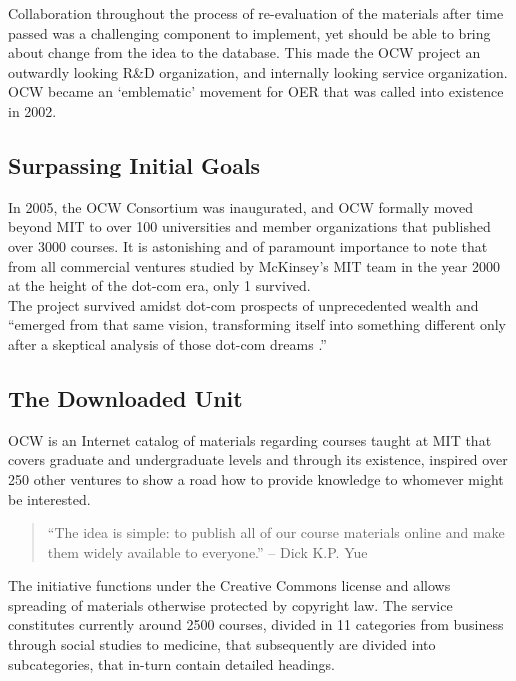 \documentclass[a4paper]{article}
\begin{document}
\noindent
Collaboration throughout the process of re-evaluation of the materials after time passed was a challenging component to implement, yet should be able to bring about change from the idea to the database. This made the OCW project an outwardly looking R\&D organization, and internally looking service organization. OCW became an `emblematic' movement for OER that was called into existence in 2002. 

\subsection{Surpassing Initial Goals} 
In 2005, the OCW Consortium was inaugurated, and OCW formally moved beyond MIT to over 100 universities and member organizations that published over 3000 courses. It is astonishing and of paramount importance to note that from all commercial ventures studied by McKinsey's MIT team in the year 2000 at the height of the dot-com era, only 1 survived.\\

\noindent
The project survived amidst dot-com prospects of unprecedented wealth and ``emerged from that same vision, transforming itself into something different only after a skeptical analysis of those dot-com dreams \cite{OCW}.''

\subsection{The Downloaded Unit} 
OCW is an Internet catalog of materials regarding courses taught at MIT that covers graduate and undergraduate levels and through its existence, inspired over 250 other ventures to show a road how to provide knowledge to whomever might be interested. \\

\begin{quote}
``The idea is simple: to publish all of our course materials online and make them widely available to everyone.'' -- Dick K.P. Yue \\
\end{quote}

\noindent
The initiative functions under the Creative Commons license and allows spreading of materials otherwise protected by copyright law. The service constitutes currently around 2500 courses, divided in 11 categories from business through social studies to medicine, that subsequently are divided into subcategories, that in-turn contain detailed headings. \\
\end{document}
